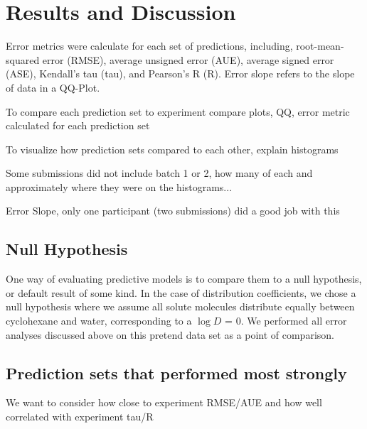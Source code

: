 \section{Results and Discussion}
\label{results:1}

\begin{table}
\label{groupStats}
\caption{Error metrics were calculate for each set of predictions, including, root-mean-squared error (RMSE), average unsigned error (AUE), average signed error (ASE), Kendall's tau (tau), and Pearson's R (R). Error slope refers to the slope of data in a QQ-Plot.}
\end{table}

To compare each prediction set to experiment compare plots, QQ, error metric calculated for each prediction set

To visualize how prediction sets compared to each other, explain histograms

Some submissions did not include batch 1 or 2, how many of each and approximately where they were on the histograms...

Error Slope, only one participant (two submissions) did a good job with this %

\subsection{Null Hypothesis}
\label{results:2}
One way of evaluating predictive models is to compare them to a null hypothesis, or default result of some kind. 
In the case of distribution coefficients, we chose a null hypothesis where we assume all solute molecules distribute equally between cyclohexane and water, corresponding to a $\log D$ = 0. 
We performed all error analyses discussed above on this pretend data set as a point of comparison. 

\subsection{Prediction sets that performed most strongly}
\label{results:2}
We want to consider how close to experiment RMSE/AUE and how well correlated with experiment tau/R

